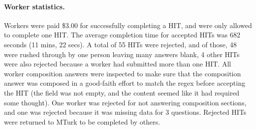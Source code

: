 \paragraph{Worker statistics.}\label{sec:workerStatistics} Workers were paid \$3.00 for successfully completing a HIT, and were only allowed to complete  one HIT.  The average completion time for accepted HITs was 682 seconds (11 mins, 22 secs).
A total of 55 HITs were rejected, and  of those, 48 were rushed through by one person leaving many answers blank, 4 other HITs were also rejected because a worker had submitted more than one HIT.  All worker composition answers were inspected to make sure that the composition answer was composed in a good-faith effort to  match the regex before accepting the HIT (the field was not empty, and the content seemed like it had required some thought). One worker was rejected for not answering composition sections, and one was rejected because it was missing data for 3 questions.  Rejected HITs were returned to MTurk to be completed by others.
